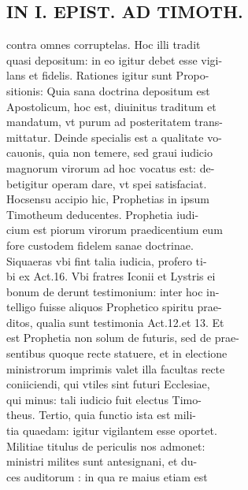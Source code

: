 \documentclass{article}
\begin{document}
\begin{pages}
\section*{IN I. EPIST. AD TIMOTH. \\
                }
contra omnes corruptelas. Hoc illi tradit \\
                quasi depositum: in eo igitur debet esse vigi- \\
                lans et fidelis. Rationes igitur sunt Propo- \\
                sitionis: Quia sana doctrina depositum est \\
                Apostolicum, hoc est, diuinitus traditum et \\
                mandatum, vt purum ad posteritatem trans- \\
                mittatur. Deinde specialis est a qualitate vo- \\
                cauonis, quia non temere, sed graui iudicio \\
                magnorum virorum ad hoc vocatus est: de- \\
                betigitur operam dare, vt spei satisfaciat. \\
                Hocsensu accipio hic, Prophetias in ipsum \\
                Timotheum deducentes. Prophetia iudi- \\
                cium est piorum virorum praedicentium eum \\
                fore custodem fidelem sanae doctrinae. \\
                Siquaeras vbi fint talia iudicia, profero ti- \\
                bi ex Act.16. Vbi fratres Iconii et Lystris ei \\
                bonum de derunt testimonium: inter hoc in- \\
                telligo fuisse aliquos Prophetico spiritu prae- \\
                ditos, qualia sunt testimonia Act.12.et 13. Et \\
                est Prophetia non solum de futuris, sed de prae- \\
                sentibus quoque recte statuere, et in electione \\
                ministrorum imprimis valet illa facultas recte \\
                coniiciendi, qui vtiles sint futuri Ecclesiae, \\
                qui minus: tali iudicio fuit electus Timo- \\
                theus. Tertio, quia functio ista est mili- \\
                tia quaedam: igitur vigilantem esse oportet. \\
                Militiae titulus de periculis nos admonet: \\
                ministri milites sunt antesignani, et du- \\
                ces auditorum : in qua re maius etiam est \\
                

\end{pages}
\end{document}
